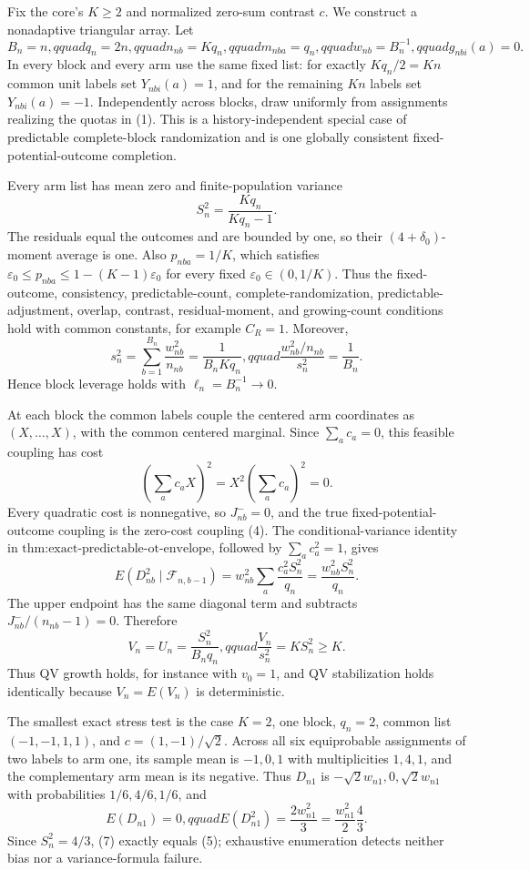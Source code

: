 Fix the core's \(K\ge2\) and normalized zero-sum contrast \(c\). We construct a nonadaptive triangular array. Let
\[
B_n=n,qquad q_n=2n,qquad n_{nb}=Kq_n,qquad
m_{nba}=q_n,qquad w_{nb}=B_n^{-1},qquad g_{nbi}(a)=0.
\tag{1}
\]
In every block and every arm use the same fixed list: for exactly \(Kq_n/2=Kn\) common unit labels set \(Y_{nbi}(a)=1\), and for the remaining \(Kn\) labels set \(Y_{nbi}(a)=-1\). Independently across blocks, draw uniformly from assignments realizing the quotas in (1). This is a history-independent special case of predictable complete-block randomization and is one globally consistent fixed-potential-outcome completion.

Every arm list has mean zero and finite-population variance
\[
S_n^2=\frac{Kq_n}{Kq_n-1}.
\tag{2}
\]
The residuals equal the outcomes and are bounded by one, so their \((4+\delta_0)\)-moment average is one. Also \(p_{nba}=1/K\), which satisfies
\(\varepsilon_0\le p_{nba}\le1-(K-1)\varepsilon_0\) for every fixed
\(\varepsilon_0\in(0,1/K)\). Thus the fixed-outcome, consistency, predictable-count, complete-randomization, predictable-adjustment, overlap, contrast, residual-moment, and growing-count conditions hold with common constants, for example \(C_R=1\). Moreover,
\[
s_n^2=\sum_{b=1}^{B_n}\frac{w_{nb}^2}{n_{nb}}
=\frac1{B_nKq_n},qquad
\frac{w_{nb}^2/n_{nb}}{s_n^2}=\frac1{B_n}.
\tag{3}
\]
Hence block leverage holds with \(\ell_n=B_n^{-1}\to0\).

At each block the common labels couple the centered arm coordinates as \((X,\ldots,X)\), with the common centered marginal. Since \(\sum_ac_a=0\), this feasible coupling has cost
\[
\left(\sum_ac_aX\right)^2=X^2\left(\sum_ac_a\right)^2=0.
\tag{4}
\]
Every quadratic cost is nonnegative, so \(J_{nb}^{-}=0\), and the true fixed-potential-outcome coupling is the zero-cost coupling (4). The conditional-variance identity in
\(\text{thm:exact-predictable-ot-envelope}\), followed by \(\sum_ac_a^2=1\), gives
\[
E(D_{nb}^2\mid\mathcal F_{n,b-1})
=w_{nb}^2\sum_a\frac{c_a^2S_n^2}{q_n}
=\frac{w_{nb}^2S_n^2}{q_n}.
\tag{5}
\]
The upper endpoint has the same diagonal term and subtracts
\(J_{nb}^{-}/(n_{nb}-1)=0\). Therefore
\[
V_n=U_n=\frac{S_n^2}{B_nq_n},qquad
\frac{V_n}{s_n^2}=KS_n^2\ge K.
\tag{6}
\]
Thus QV growth holds, for instance with \(v_0=1\), and QV stabilization holds identically because \(V_n=E(V_n)\) is deterministic.

The smallest exact stress test is the case \(K=2\), one block, \(q_n=2\), common list
\((-1,-1,1,1)\), and \(c=(1,-1)/\sqrt2\). Across all six equiprobable assignments of two labels to arm one, its sample mean is \(-1,0,1\) with multiplicities \(1,4,1\), and the complementary arm mean is its negative. Thus \(D_{n1}\) is
\(-\sqrt2w_{n1},0,\sqrt2w_{n1}\) with probabilities \(1/6,4/6,1/6\), and
\[
E(D_{n1})=0,qquad E(D_{n1}^2)=\frac{2w_{n1}^2}{3}
=\frac{w_{n1}^2}{2}\frac43.
\tag{7}
\]
Since \(S_n^2=4/3\), (7) exactly equals (5); exhaustive enumeration detects neither bias nor a variance-formula failure.

